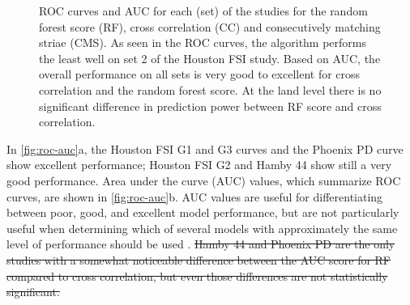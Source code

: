 \documentclass[doubleblind]{elsarticle}\usepackage[]{graphicx}\usepackage[]{color}
\newenvironment{knitrout}{}{} %
\providecommand{\DIFaddtex}[1]{{\protect\color{blue}\uwave{#1}}} %
\providecommand{\DIFdeltex}[1]{{\protect\color{red}\sout{#1}}}                      %
\providecommand{\DIFdelbegin}{} %
\providecommand{\DIFdelend}{} %
\providecommand{\DIFaddFL}[1]{\DIFadd{#1}} %
\providecommand{\DIFaddbeginFL}{} %
\providecommand{\DIFaddendFL}{} %
\providecommand{\DIFadd}[1]{\texorpdfstring{\DIFaddtex{#1}}{#1}} %
\providecommand{\DIFdel}[1]{\texorpdfstring{\DIFdeltex{#1}}{}} %
\newcommand{\DIFscaledelfig}{0.5}
\newlength{\DIFdelgraphicswidth} %
\newlength{\DIFdelgraphicsheight} %
\newcommand{\DIFaddincludegraphics}[2][]{{\color{blue}\fbox{\DIFOincludegraphics[#1]{#2}}}} %
\newcommand{\DIFdelincludegraphics}[2][]{%
\sbox{\DIFdelgraphicsbox}{\DIFOincludegraphics[#1]{#2}}%
\settoboxwidth{\DIFdelgraphicswidth}{\DIFdelgraphicsbox} %
\settoboxtotalheight{\DIFdelgraphicsheight}{\DIFdelgraphicsbox} %
\scalebox{\DIFscaledelfig}{%
\parbox[b]{\DIFdelgraphicswidth}{\usebox{\DIFdelgraphicsbox}\\[-\baselineskip] \rule{\DIFdelgraphicswidth}{0em}}\llap{\resizebox{\DIFdelgraphicswidth}{\DIFdelgraphicsheight}{%
\setlength{\unitlength}{\DIFdelgraphicswidth}%
\begin{picture}(1,1)%
\thicklines\linethickness{2pt} %
{\color[rgb]{1,0,0}\put(0,0){\framebox(1,1){}}}%
{\color[rgb]{1,0,0}\put(0,0){\line( 1,1){1}}}%
{\color[rgb]{1,0,0}\put(0,1){\line(1,-1){1}}}%
\end{picture}%
}\hspace*{3pt}}} %
} %
\DeclareRobustCommand{\DIFdelbegin}{\DIFOdelbegin \let\includegraphics\DIFdelincludegraphics} %
\DeclareRobustCommand{\DIFdelend}{\DIFOaddend \let\includegraphics\DIFOincludegraphics} %
\DeclareRobustCommand{\DIFaddbeginFL}{\DIFOaddbeginFL \let\includegraphics\DIFaddincludegraphics} %
\DeclareRobustCommand{\DIFaddendFL}{\DIFOaddendFL \let\includegraphics\DIFOincludegraphics} %
\begin{document}
\begin{knitrout}
\color{fgcolor}\begin{figure}

{\centering {}

}

\caption[ROC curves and AUC for each (set) of the studies for the random forest score (RF), cross correlation (CC) and consecutively matching striae (CMS)]{ROC curves and AUC for each (set) of the studies for the random forest score (RF), cross correlation (CC) and consecutively matching striae (CMS).   As seen in the ROC curves, the algorithm performs the least well on set 2 of the Houston FSI study. Based on AUC, the overall performance on all sets is very good to excellent for \DIFaddbeginFL \DIFaddFL{both the }\DIFaddendFL cross correlation and the random forest score\DIFaddbeginFL \DIFaddFL{, and moderate for CMS scores}\DIFaddendFL . At the land level there is no significant difference in prediction power between RF score and cross correlation.}\label{fig:roc-auc}
\end{figure}


\end{knitrout}

In \autoref{fig:roc-auc}a, the Houston FSI G1 and G3 curves and the Phoenix PD curve show excellent performance; Houston FSI G2 and Hamby 44 show still a very  good performance. Area under the curve (AUC) values, which summarize ROC curves, are shown in \autoref{fig:roc-auc}b. AUC values are useful for differentiating between poor, good, and excellent model performance, but are not particularly useful when determining which of several models with approximately the same level of performance should be used \citep{marzban_roc_2004}. \DIFdelbegin \DIFdel{Hamby 44 and Phoenix PD are the only studies with a somewhat noticeable difference between the AUC score for RF compared to cross correlation, but even those differences are not statistically significant.
}\DIFdelend %
\end{document}
